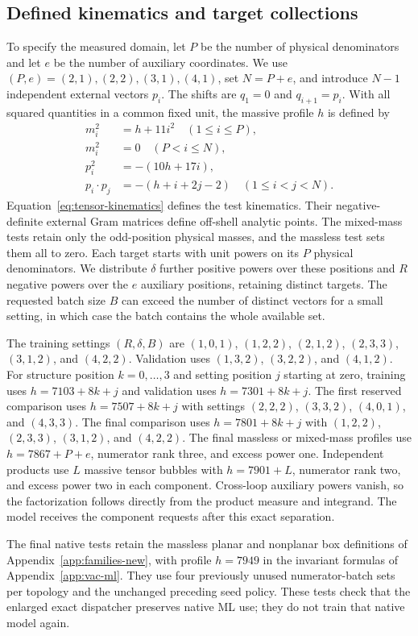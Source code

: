 \subsection{Defined kinematics and target collections}
To specify the measured domain, let $P$ be the number of physical denominators and let $e$ be the number of auxiliary coordinates. We use $(P,e)=(2,1),(2,2),(3,1),(4,1)$, set $N=P+e$, and introduce $N-1$ independent external vectors $p_i$. The shifts are $q_1=0$ and $q_{i+1}=p_i$. With all squared quantities in a common fixed unit, the massive profile $h$ is defined by
\begin{align}
 m_i^2&=h+11i^2\quad(1\leq i\leq P),\\
 m_i^2&=0\quad(P<i\leq N),\\
 p_i^2&=-(10h+17i),\\
 p_i\cdot p_j&=-(h+i+2j-2)\quad(1\leq i<j<N).
 \label{eq:tensor-kinematics}
\end{align}
Equation~\eqref{eq:tensor-kinematics} defines the test kinematics. Their negative-definite external Gram matrices define off-shell analytic points. The mixed-mass tests retain only the odd-position physical masses, and the massless test sets them all to zero. Each target starts with unit powers on its $P$ physical denominators. We distribute $\delta$ further positive powers over these positions and $R$ negative powers over the $e$ auxiliary positions, retaining distinct targets. The requested batch size $B$ can exceed the number of distinct vectors for a small setting, in which case the batch contains the whole available set.

The training settings $(R,\delta,B)$ are $(1,0,1)$, $(1,2,2)$, $(2,1,2)$, $(2,3,3)$, $(3,1,2)$, and $(4,2,2)$. Validation uses $(1,3,2)$, $(3,2,2)$, and $(4,1,2)$. For structure position $k=0,\ldots,3$ and setting position $j$ starting at zero, training uses $h=7103+8k+j$ and validation uses $h=7301+8k+j$. The first reserved comparison uses $h=7507+8k+j$ with settings $(2,2,2)$, $(3,3,2)$, $(4,0,1)$, and $(4,3,3)$. The final comparison uses $h=7801+8k+j$ with $(1,2,2)$, $(2,3,3)$, $(3,1,2)$, and $(4,2,2)$. The final massless or mixed-mass profiles use $h=7867+P+e$, numerator rank three, and excess power one. Independent products use $L$ massive tensor bubbles with $h=7901+L$, numerator rank two, and excess power two in each component. Cross-loop auxiliary powers vanish, so the factorization follows directly from the product measure and integrand. The model receives the component requests after this exact separation.

The final native tests retain the massless planar and nonplanar box definitions of Appendix~\ref{app:families-new}, with profile $h=7949$ in the invariant formulas of Appendix~\ref{app:vac-ml}. They use four previously unused numerator-batch sets per topology and the unchanged preceding seed policy. These tests check that the enlarged exact dispatcher preserves native ML use; they do not train that native model again.
